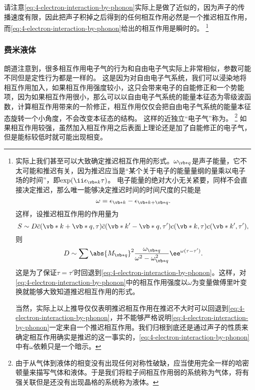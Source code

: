 请注意\eqref{eq:4-electron-interaction-by-phonon}实际上是做了近似的，因为声子的传播速度有限，因此把声子积掉之后得到的任何相互作用必然是一个推迟相互作用，而\eqref{eq:4-electron-interaction-by-phonon}给出的相互作用是瞬时的。%
\footnote{
    实际上我们甚至可以大致确定推迟相互作用的形式。$\omega_{\vb*{q}}$是声子能量，它不太可能和推迟有关，因为推迟应当是“某个关于电子的能量量纲的量乘以电子场的时间”，即$\exp(\ii \epsilon_{\vb*{k}} \tau)$。
    电子能量的绝对大小无关紧要，同样不会直接决定推迟，那么唯一能够决定推迟时间的时间尺度的只能是
    \[
        \omega = \epsilon_{\vb*{k}} - \epsilon_{\vb*{k} + \vb*{q}}.
    \]
    这样，设推迟相互作用的作用量为
    \[
        S \sim D \bar{c}(\vb*{k}+\vb*{q}, \tau) \bar{c}(\vb*{k}'-\vb*{q}, \tau') c(\vb*{k}, \tau) c(\vb*{k}', \tau'),
    \]
    则
    \[
        D \sim \sum \abs{M_{\vb*{q}}}^2 \frac{\omega_{\vb*{q}}}{\omega^2 - \omega_{\vb*{q}}^2} \ee^{\omega(\tau - \tau')}.
    \]
    这是为了保证$\tau=\tau'$时回退到\eqref{eq:4-electron-interaction-by-phonon}。这样，对\eqref{eq:4-electron-interaction-by-phonon}中的相互作用强度以$\omega$为变量做傅里叶变换就能够大致知道推迟相互作用的形式。

    当然，实际上以上推导仅仅表明推迟相互作用在推迟不大时可以回退到\eqref{eq:4-electron-interaction-by-phonon}，并不能够严格说明\eqref{eq:4-electron-interaction-by-phonon}一定来自一个推迟相互作用。我们归根到底还是通过声子的性质来确定相互作用确实是推迟的这一事实的，\eqref{eq:4-electron-interaction-by-phonon}中有$\omega$依赖只是一个暗示。
}%


\subsubsection{费米液体}

朗道注意到，很多相互作用电子气的行为和自由电子气实际上非常相似，参数可能不同但是定性行为都是一样的。
这是因为对自由电子气系统，我们可以浸染地将相互作用加入，如果相互作用强度较小，这只会带来电子的自能修正和一个势能项，因为如果相互作用很小，那么可以以自由电子气系统的能量本征态为零级波函数，计算相互作用带来的一阶修正，相互作用仅仅会把自由电子气系统的能量本征态旋转一个小角度，不会改变本征态的结构。
这样的近独立“电子气”称为。%
\footnote{由于从气体到液体的相变没有出现任何对称性破缺，应当使用完全一样的哈密顿量来描写气体和液体。于是我们将粒子间相互作用弱的系统称为气体，将有强关联但是还没有出现晶格的系统称为液体。}%
如果相互作用较强，虽然加入相互作用之后表面上理论还是加了自能修正的电子气，但是能标较低时就可能出现相变。

